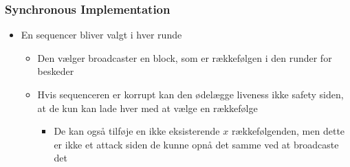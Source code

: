 \documentclass[a4, english]{article}
\begin{document}
\subsubsection{Synchronous Implementation}
\begin{itemize}
	\item En sequencer bliver valgt i hver runde 
  \begin{itemize}
  	\item Den vælger broadcaster en block, som er rækkefølgen i den runder for beskeder
    \item Hvis sequenceren er korrupt kan den ødelægge liveness ikke safety siden, at de kun kan lade hver med at vælge en rækkefølge 
    \begin{itemize}
    	\item De kan også tilføje en ikke eksisterende $x$ rækkefølgenden, men dette er ikke et attack siden de kunne opnå det samme ved at broadcaste det
    \end{itemize}
  \end{itemize}
\end{itemize}
\end{document}
